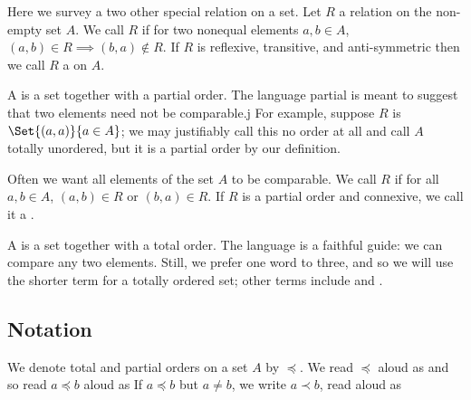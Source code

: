 Here we survey a two other special relation on a set.
Let $R$ a relation on the non-empty set $A$.
We call $R$  if for two nonequal elements $a, b \in A$, $(a, b) \in R \implies (b, a) \not\in R$.
If $R$ is reflexive, transitive, and anti-symmetric then we call $R$ a  on $A$.

A  is a set together with a partial order.
The language partial is meant to suggest that two elements need not be comparable.j
For example, suppose $R$ is $\Set{(a,a)}{a \in A}$; we may justifiably call this no order at all and call $A$ totally unordered, but it is a partial order by our definition.

Often we want all elements of the set $A$ to be comparable.
We call $R$  if for all $a, b \in A$, $(a, b) \in R$ or $(b, a) \in R$.
If $R$ is a partial order and connexive, we call it a .


A  is a set together with a total order.
The language is a faithful guide: we can compare any two elements.
Still, we prefer one word to three, and so we will use the shorter term  for a totally ordered set; other terms include  and .

\subsection{Notation}
We denote total and partial orders on a set $A$ by $\preceq$.
We read $\preceq$ aloud as  and so read $a\preceq b$ aloud as 
If $a \preceq b$ but $a \neq b$, we write $a \prec b$, read aloud as 



